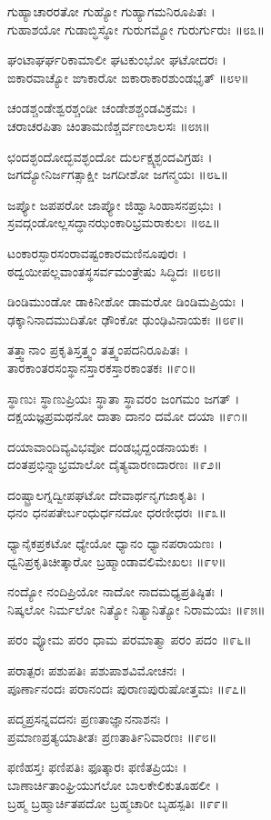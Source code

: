 ಗುಹ್ಯಾಚಾರರತೋ ಗುಹ್ಯೋ ಗುಹ್ಯಾಗಮನಿರೂಪಿತಃ ।\\
ಗುಹಾಶಯೋ ಗುಡಾಬ್ಧಿಸ್ಥೋ ಗುರುಗಮ್ಯೋ ಗುರುರ್ಗುರುಃ ॥೮೩॥

ಘಂಟಾಘರ್ಘರಿಕಾಮಾಲೀ ಘಟಕುಂಭೋ ಘಟೋದರಃ ।\\
ಙಕಾರವಾಚ್ಯೋ ಙಾಕಾರೋ ಙಕಾರಾಕಾರಶುಂಡಭೃತ್ ॥೮೪॥

ಚಂಡಶ್ಚಂಡೇಶ್ವರಶ್ಚಂಡೀ ಚಂಡೇಶಶ್ಚಂಡವಿಕ್ರಮಃ ।\\
ಚರಾಚರಪಿತಾ ಚಿಂತಾಮಣಿಶ್ಚರ್ವಣಲಾಲಸಃ ॥೮೫॥

ಛಂದಶ್ಛಂದೋದ್ಭವಶ್ಛಂದೋ ದುರ್ಲಕ್ಷ್ಯಶ್ಛಂದವಿಗ್ರಹಃ ।\\
ಜಗದ್ಯೋನಿರ್ಜಗತ್ಸಾಕ್ಷೀ ಜಗದೀಶೋ ಜಗನ್ಮಯಃ ॥೮೬॥

ಜಪ್ಯೋ ಜಪಪರೋ ಜಾಪ್ಯೋ ಜಿಹ್ವಾಸಿಂಹಾಸನಪ್ರಭುಃ ।\\
ಸ್ರವದ್ಗಂಡೋಲ್ಲಸದ್ಧಾನಝಂಕಾರಿಭ್ರಮರಾಕುಲಃ ॥೮೭॥

ಟಂಕಾರಸ್ಫಾರಸಂರಾವಷ್ಟಂಕಾರಮಣಿನೂಪುರಃ ।\\
ಠದ್ವಯೀಪಲ್ಲವಾಂತಸ್ಥಸರ್ವಮಂತ್ರೇಷು ಸಿದ್ಧಿದಃ ॥೮೮॥

ಡಿಂಡಿಮುಂಡೋ ಡಾಕಿನೀಶೋ ಡಾಮರೋ ಡಿಂಡಿಮಪ್ರಿಯಃ ।\\
ಢಕ್ಕಾನಿನಾದಮುದಿತೋ ಢೌಂಕೋ ಢುಂಢಿವಿನಾಯಕಃ ॥೮೯॥

ತತ್ತ್ವಾನಾಂ ಪ್ರಕೃತಿಸ್ತತ್ತ್ವಂ ತತ್ತ್ವಂಪದನಿರೂಪಿತಃ ।\\
ತಾರಕಾಂತರಸಂಸ್ಥಾನಸ್ತಾರಕಸ್ತಾರಕಾಂತಕಃ ॥೯೦॥

ಸ್ಥಾಣುಃ ಸ್ಥಾಣುಪ್ರಿಯಃ ಸ್ಥಾತಾ ಸ್ಥಾವರಂ ಜಂಗಮಂ ಜಗತ್ ।\\
ದಕ್ಷಯಜ್ಞಪ್ರಮಥನೋ ದಾತಾ ದಾನಂ ದಮೋ ದಯಾ ॥೯೧॥

ದಯಾವಾಂದಿವ್ಯವಿಭವೋ ದಂಡಭೃದ್ದಂಡನಾಯಕಃ ।\\
ದಂತಪ್ರಭಿನ್ನಾಭ್ರಮಾಲೋ ದೈತ್ಯವಾರಣದಾರಣಃ ॥೯೨॥

ದಂಷ್ಟ್ರಾಲಗ್ನದ್ವೀಪಘಟೋ ದೇವಾರ್ಥನೃಗಜಾಕೃತಿಃ ।\\
ಧನಂ ಧನಪತೇರ್ಬಂಧುರ್ಧನದೋ ಧರಣೀಧರಃ ॥೯೩॥

ಧ್ಯಾನೈಕಪ್ರಕಟೋ ಧ್ಯೇಯೋ ಧ್ಯಾನಂ ಧ್ಯಾನಪರಾಯಣಃ ।\\
ಧ್ವನಿಪ್ರಕೃತಿಚೀತ್ಕಾರೋ ಬ್ರಹ್ಮಾಂಡಾವಲಿಮೇಖಲಃ ॥೯೪॥

ನಂದ್ಯೋ ನಂದಿಪ್ರಿಯೋ ನಾದೋ ನಾದಮಧ್ಯಪ್ರತಿಷ್ಠಿತಃ ।\\
ನಿಷ್ಕಲೋ ನಿರ್ಮಲೋ ನಿತ್ಯೋ ನಿತ್ಯಾನಿತ್ಯೋ ನಿರಾಮಯಃ ॥೯೫॥

ಪರಂ ವ್ಯೋಮ ಪರಂ ಧಾಮ ಪರಮಾತ್ಮಾ ಪರಂ ಪದಂ ॥೯೬॥

ಪರಾತ್ಪರಃ ಪಶುಪತಿಃ ಪಶುಪಾಶವಿಮೋಚನಃ ।\\
ಪೂರ್ಣಾನಂದಃ ಪರಾನಂದಃ ಪುರಾಣಪುರುಷೋತ್ತಮಃ ॥೯೭॥

ಪದ್ಮಪ್ರಸನ್ನವದನಃ ಪ್ರಣತಾಜ್ಞಾನನಾಶನಃ ।\\
ಪ್ರಮಾಣಪ್ರತ್ಯಯಾತೀತಃ ಪ್ರಣತಾರ್ತಿನಿವಾರಣಃ ॥೯೮॥

ಫಣಿಹಸ್ತಃ ಫಣಿಪತಿಃ ಫೂತ್ಕಾರಃ ಫಣಿತಪ್ರಿಯಃ ।\\
ಬಾಣಾರ್ಚಿತಾಂಘ್ರಿಯುಗಲೋ ಬಾಲಕೇಲಿಕುತೂಹಲೀ ।\\
ಬ್ರಹ್ಮ ಬ್ರಹ್ಮಾರ್ಚಿತಪದೋ ಬ್ರಹ್ಮಚಾರೀ ಬೃಹಸ್ಪತಿಃ ॥೯೯॥

